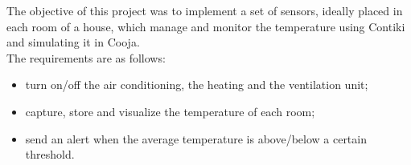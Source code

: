 The objective of this project was to implement a set of sensors, ideally placed in each room of a house, which manage and monitor the temperature using Contiki and simulating it in Cooja.\\
The requirements are as follows:
\begin{itemize}
	\item turn on/off the air conditioning, the heating and the ventilation unit;
	\item capture, store and visualize the temperature of each room;
	\item send an alert when the average temperature is above/below a certain
threshold.   
\end{itemize}
